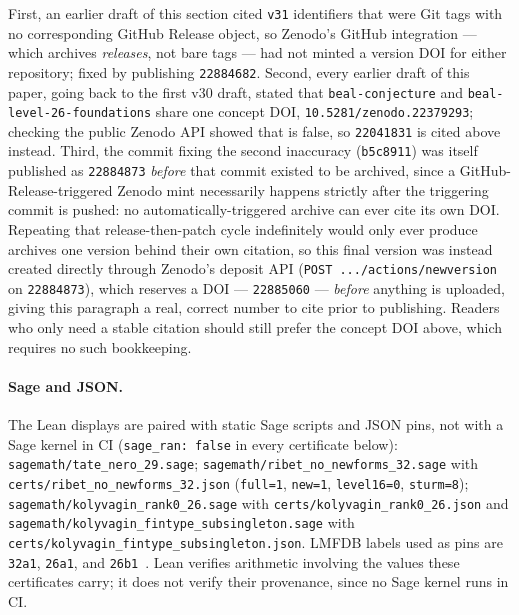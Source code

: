 \begin{honesty}
First, an earlier draft of this section cited \texttt{v31}
identifiers that were Git tags with no corresponding GitHub Release
object, so Zenodo's GitHub integration --- which archives
\emph{releases}, not bare tags --- had not minted a version DOI for
either repository; fixed by publishing \texttt{22884682}.
Second, every earlier draft of this paper, going back to the first
v30 draft, stated that \texttt{beal-conjecture} and
\texttt{beal-level-26-foundations} share one concept DOI,
\texttt{10.5281/zenodo.22379293}; checking the public Zenodo API
showed that is false, so \texttt{22041831} is cited above instead.
Third, the commit fixing the second inaccuracy (\texttt{b5c8911})
was itself published as \texttt{22884873} \emph{before} that commit
existed to be archived, since a GitHub-Release-triggered Zenodo
mint necessarily happens strictly after the triggering commit is
pushed: no automatically-triggered archive can ever cite its own
DOI. Repeating that release-then-patch cycle indefinitely would only
ever produce archives one version behind their own citation, so this
final version was instead created directly through Zenodo's deposit
API (\texttt{POST .../actions/newversion} on \texttt{22884873}),
which reserves a DOI --- \texttt{22885060} --- \emph{before} anything
is uploaded, giving this paragraph a real, correct number to cite
prior to publishing. Readers who only need a stable citation should
still prefer the concept DOI above, which requires no such
bookkeeping.
\end{honesty}

\paragraph{Sage and JSON.}
The Lean displays are paired with static Sage scripts and JSON pins,
not with a Sage kernel in CI (\texttt{sage\_ran: false} in every
certificate below):
\texttt{sagemath/tate\_nero\_29.sage};
\texttt{sagemath/ribet\_no\_newforms\_32.sage} with
\texttt{certs/ribet\_no\_newforms\_32.json}
(\texttt{full=1}, \texttt{new=1}, \texttt{level16=0},
\texttt{sturm=8});
\texttt{sagemath/kolyvagin\_rank0\_26.sage} with
\texttt{certs/kolyvagin\_rank0\_26.json} and
\texttt{sagemath/kolyvagin\_fintype\_subsingleton.sage} with
\texttt{certs/kolyvagin\_fintype\_subsingleton.json}.
LMFDB labels used as pins are \texttt{32a1}, \texttt{26a1}, and
\texttt{26b1}~\cite{lmfdb}. Lean verifies arithmetic involving the
values these certificates carry; it does not verify their
provenance, since no Sage kernel runs in CI.


